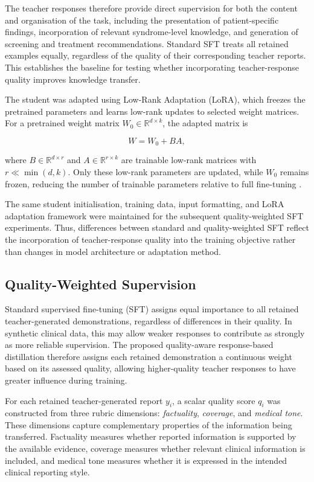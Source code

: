 \documentclass[ %
                    author={Aman Kumar Singh},
                supervisor={Dr. Edwin Simpson},
                    degree={MSc},
                     title={Quality-Aware Knowledge Distillation of Large Language Models for Efficient Personalised Clinical Report Generation},
                  subtitle={},
                      type={},
                      year={2021}]{dissertation}
\begin{document}
The teacher responses therefore provide direct supervision for both the
content and organisation of the task, including the presentation of
patient-specific findings, incorporation of relevant syndrome-level
knowledge, and generation of screening and treatment recommendations.
Standard SFT treats all retained examples equally, regardless of the quality
of their corresponding teacher reports. This establishes the baseline for
testing whether incorporating teacher-response quality improves knowledge
transfer.

The student was adapted using Low-Rank Adaptation (LoRA), which freezes the
pretrained parameters and learns low-rank updates to selected weight
matrices. For a pretrained weight matrix
$W_0 \in \mathbb{R}^{d\times k}$, the adapted matrix is

\begin{equation}
W = W_0 + BA,
\label{eq:lora_update}
\end{equation}

where $B \in \mathbb{R}^{d\times r}$ and
$A \in \mathbb{R}^{r\times k}$ are trainable low-rank matrices with
$r \ll \min(d,k)$. Only these low-rank parameters are updated, while
$W_0$ remains frozen, reducing the number of trainable parameters relative
to full fine-tuning \cite{hu_lora_2021}.

The same student initialisation, training data, input formatting, and LoRA
adaptation framework were maintained for the subsequent quality-weighted SFT
experiments. Thus, differences between standard and quality-weighted SFT
reflect the incorporation of teacher-response quality into the training
objective rather than changes in model architecture or adaptation method.
\subsection{Quality-Weighted Supervision}
\label{sec:quality_weighted_sft}

Standard supervised fine-tuning (SFT) assigns equal importance to all
retained teacher-generated demonstrations, regardless of differences in
their quality. In synthetic clinical data, this may allow weaker responses
to contribute as strongly as more reliable supervision. The proposed
quality-aware response-based distillation therefore assigns each retained
demonstration a continuous weight based on its assessed quality, allowing
higher-quality teacher responses to have greater influence during training.

For each retained teacher-generated report $y_i$, a scalar quality score
$q_i$ was constructed from three rubric dimensions:
\textit{factuality}, \textit{coverage}, and \textit{medical tone}. These
dimensions capture complementary properties of the information being
transferred. Factuality measures whether reported information is supported
by the available evidence, coverage measures whether relevant clinical
information is included, and medical tone measures whether it is expressed
in the intended clinical reporting style.
\end{document}
